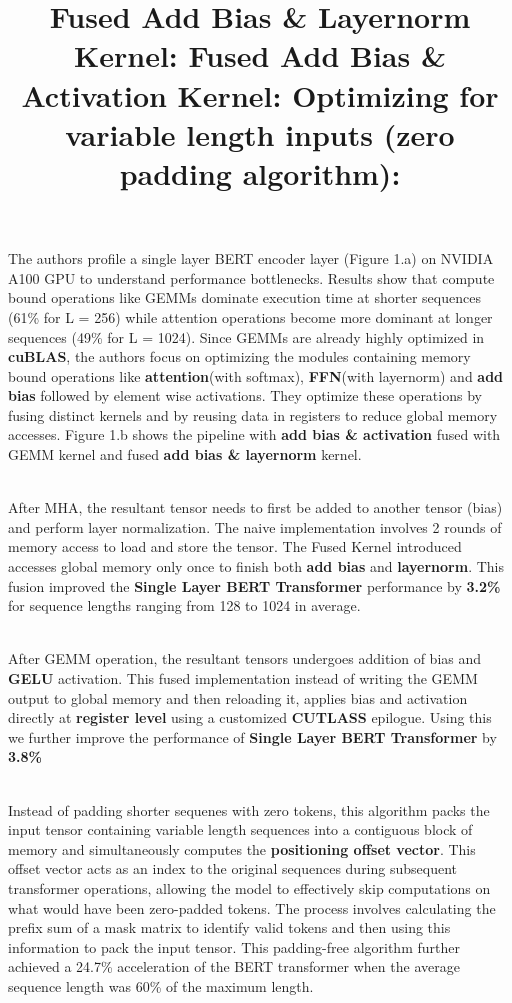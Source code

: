 \documentclass{article}
\begin{document}
The authors profile a single layer BERT encoder layer (Figure 1.a) on NVIDIA A100 GPU to understand performance bottlenecks. Results show that compute bound operations like GEMMs dominate execution time at shorter sequences (61\% for L = 256) while attention operations become more dominant at longer sequences (49\% for L = 1024). Since GEMMs are already highly optimized in \textbf{cuBLAS}, the authors focus on optimizing the modules containing memory bound operations like \textbf{attention}(with softmax), \textbf{FFN}(with layernorm) and \textbf{add bias} followed by element wise activations. They optimize these operations by fusing distinct kernels and by reusing data in registers to reduce global memory accesses. Figure 1.b shows the pipeline with \textbf{add bias \& activation} fused with GEMM kernel and fused \textbf{add bias \& layernorm} kernel. \\ \\
\title{\textbf{Fused Add Bias \& Layernorm Kernel: }}After MHA, the resultant tensor needs to first be added to another tensor (bias) and perform layer normalization. The naive implementation involves 2 rounds of memory access to load and store the tensor. The Fused Kernel introduced accesses global memory only once to finish both \textbf{add bias} and \textbf{layernorm}. This fusion improved the \textbf{Single Layer BERT Transformer} performance by \textbf{3.2\%} for sequence lengths ranging from 128 to 1024 in average. \\ \\ 
\title{\textbf{Fused Add Bias \& Activation Kernel: }} After GEMM operation, the resultant tensors undergoes addition of bias and \textbf{GELU} activation. This fused implementation instead of writing the GEMM output to global memory and then reloading it, applies bias and activation directly at \textbf{register level} using a customized \textbf{CUTLASS} epilogue. Using this we further improve the performance of \textbf{Single Layer BERT Transformer} by \textbf{3.8\%} \\ \\
\title{\textbf{Optimizing for variable length inputs (zero padding algorithm): }}Instead of padding shorter sequenes with zero tokens, this algorithm packs the input tensor containing variable length sequences into a contiguous block of memory and simultaneously computes the \textbf{positioning offset vector}. This offset vector acts as an index to the original sequences during subsequent transformer operations, allowing the model to effectively skip computations on what would have been zero-padded tokens. The process involves calculating the prefix sum of a mask matrix to identify valid tokens and then using this information to pack the input tensor. This padding-free algorithm further achieved a 24.7\% acceleration of the BERT transformer when the average sequence length was 60\% of the maximum length. \\ \\ 
\end{document}
